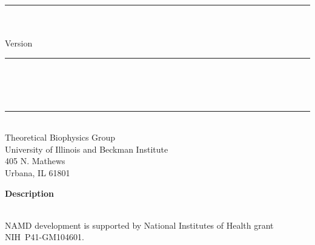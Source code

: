 
\thispagestyle{empty}

\vspace*{0.3in}

\begin{centering}
  \rule{6in}{0.04in}				\\	\vspace{0.25in}
  {\Huge \NAMD\ \DOCTITLE}			\\	\vspace{0.25in}
  {\Large Version \NAMDVER}			\\	\vspace{0.20in}
  \rule{6in}{0.04in}				\\	\vspace{0.25in}
  {\Large \NAMDAUTHORS}				\\	\vspace{0.20in}
  \NAMDDATE					\\	\vspace{0.20in}
  \rule{6in}{0.04in}				\\	\vspace{0.25in}
  {\large       Theoretical Biophysics Group}                  \\ 
  {\large       University of Illinois and Beckman Institute}  \\ 
  {\large       405 N. Mathews}                                \\ 
  {\large       Urbana, IL  61801}                             \\
\end{centering}
\vspace{0.2in}

\begin{center}
  {\Large \bf Description}
\end{center}

\noindent \DOCDESC
\vspace{0.1in} \\
NAMD development is supported by National Institutes of Health
grant NIH~P41-GM104601.

